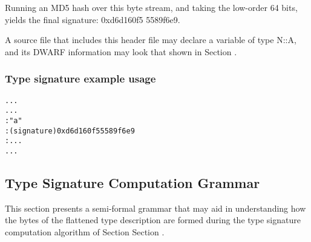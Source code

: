 Running an MD5 hash over this byte stream, and taking the
low-order 64 bits, yields the final signature: 0xd6d160f5
5589f6e9.


A source file that includes this header file may declare a
variable of type N::A, and its DWARF information may look
that shown in 
Section .


\subsubsection{Type signature example usage}
\label{app:typesignatureexampleusage}

\begin{alltt}
  ...
    ...
       : "a"
       : (signature) 0xd6d160f5 5589f6e9
       : ...
    ...
\end{alltt}

\subsection{Type Signature Computation Grammar}
\label{app:typesignaturecomputationgrammar}

This section
presents a semi-formal grammar that may aid in understanding
how the bytes of the flattened type description are formed
during the type signature computation algorithm of Section
Section . 


